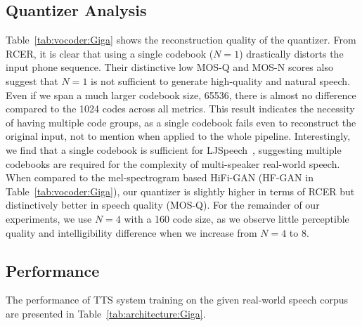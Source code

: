 \documentclass[letterpaper]{article}
\begin{document}
\subsection{Quantizer Analysis}
\label{ssec:quantana}

Table~\ref{tab:vocoder:Giga} shows the reconstruction quality of the quantizer.
From RCER, it is clear that using a single codebook ($N=1$) drastically distorts the input phone sequence.
Their distinctive low MOS-Q and MOS-N scores also suggest that $N=1$ is not sufficient to generate high-quality and natural speech.
Even if we span a much larger codebook size, 65536, there is almost no difference compared to the 1024 codes across all metrics.
This result indicates the necessity of having multiple code groups, as a single codebook fails even to reconstruct the original input, not to mention when applied to the whole pipeline.
Interestingly, we find that a single codebook is sufficient for LJSpeech~\cite{ljspeech17}, suggesting multiple codebooks are required for the complexity of multi-speaker real-world speech.
When compared to the mel-spectrogram based HiFi-GAN (HF-GAN in Table~\ref{tab:vocoder:Giga}), our quantizer is slightly higher in terms of RCER but distinctively better in speech quality (MOS-Q).
For the remainder of our experiments, we use $N=4$ with a 160 code size, as we observe little perceptible quality and intelligibility difference when we increase from $N=4$ to $8$.



\subsection{Performance}
\label{ssec:performance}
The performance of TTS system training on the given real-world speech corpus are presented in Table~\ref{tab:architecture:Giga}.
\end{document}
